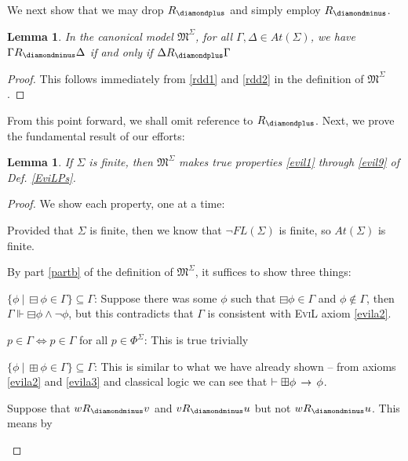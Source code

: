 \documentclass[11pt]{article}
\newtheorem{lemma}[theorem]{Lemma}
\newcommand{\DD}{\diamondminus}
\newcommand{\DDI}{\diamondplus}
\newcommand{\BB}{\boxminus}
\newcommand{\BBI}{\boxplus}
\begin{document}
We next show that we may drop $R_{\DDI}$ and simply employ $R_\DD$.
\begin{lemma}
In the canonical model $\mathfrak{M}^\Sigma$, for all $\Gamma,\Delta \in At(\Sigma)$, we have $\Gamma R_\DD \Delta$ if and only if $\Delta R_{\DDI} \Gamma$
\end{lemma}
\begin{proof}
This follows immediately from \ref{rdd1} and \ref{rdd2} in the definition of $\mathfrak{M}^\Sigma$.
\end{proof}

From this point forward, we shall omit reference to $R_{\DDI}$. Next, we prove the fundamental result of our efforts: %
\begin{lemma}\label{ddrev}
If $\Sigma$ is finite, then $\mathfrak{M}^\Sigma$ makes true properties \emph{\ref{evil1}} through \emph{\ref{evil9}} of Def. \ref{EviLPs}.
\end{lemma}
\begin{proof} We show each property, one at a time:
\begin{myroman}
	\item Provided that $\Sigma$ is finite, then we know that $\neg FL(\Sigma)$ is finite, so $At(\Sigma)$ is finite.
	\item By part \ref{partb} of the definition of $\mathfrak{M}^\Sigma$, it suffices to show three things:
	\begin{mynum}
	         \item  $\{\phi \ |\  \BB \phi \in \Gamma\} \subseteq  \Gamma$:  Suppose there was some $\phi$ such that $\BB \phi \in \Gamma$ and $\phi \nin \Gamma$, then $\Gamma \Vdash \BB\phi \wedge \neg \phi$, but this contradicts that $\Gamma$ is consistent with  \textsc{EviL} axiom \ref{evila2}.
	         \item $p \in \Gamma \iff p \in \Gamma$ for all $p \in \Phi^\Sigma$:  This is true trivially
	         \item  $\{\phi \ |\  \BBI \phi \in \Gamma\} \subseteq  \Gamma$:  This is similar to what we have already shown -- from axioms \ref{evila2} and \ref{evila3} and classical logic we can see that $\vdash \BBI \phi \IMPL \phi$.
	\end{mynum}
	\item Suppose that $w R_\DD v$ and $v R_\DD u$ but not $w R_\DD u$.  This means by 
\end{myroman}
\end{proof}
\end{document}
